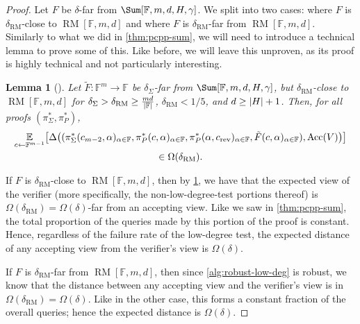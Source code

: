 \documentclass[english,12pt]{reedthesis}
\theoremstyle{plain}
\newtheorem{lemma}[lemma]{Lemma}
\theoremstyle{definition}
\theoremstyle{remark}
\DeclareMathOperator{\Acc}{Acc}
\DeclareMathOperator{\rev}{rev}
\DeclareMathOperator{\RM}{RM}
\DeclarePairedDelimiter{\abs}{\lvert}{\rvert}
\begin{document}
\begin{proof}
  Let $F$ be $\delta$-far from $\Sum[\mathbb{F}, m, d, H, \gamma]$. We split into two
  cases: where $F$ is $\delta_{\RM}$-close to $\RM[\mathbb{F}, m, d]$ and where $F$
  is $\delta_{\RM}$-far from $\RM[\mathbb{F}, m, d]$. Similarly to what we did in
  \cref{thm:pcpp-sum}, we will need to introduce a technical lemma to prove some
  of this. Like before, we will leave this unproven, as its proof is highly
  technical and not particularly interesting.

  \begin{lemma}[{\cite[Lemma 5.3]{GOS25}}]\label{lem:sum-ev-close}
    Let $\tilde{F}\colon \mathbb{F}^{m} \rightarrow \mathbb{F}$ be $\delta_{\Sigma}$-far from
    $\Sum[\mathbb{F}, m, d, H, \gamma]$, but $\delta_{\RM}$-close to $\RM[\mathbb{F}, m, d]$
    for $\delta_{\Sigma} > \delta_{\RM} \ge \frac{md}{\abs{\mathbb{F}}}$, $\delta_{\RM} < 1/5$, and
    $d \ge \abs{H} + 1$. Then, for all proofs $(\pi_{\Sigma}^{*}, \pi_{P}^{*})$,
    \begin{multline}
      \underset{c \leftarrow \mathbb{F}^{m-1}}{\mathbb{E}}\mleft[
      \Delta\mleft(
      (\pi_{\Sigma}^{*}(c_{m-2}, \alpha)_{\alpha \in \mathbb{F}}, \pi_{P}^{*}(c, \alpha)_{\alpha \in \mathbb{F}},
      \pi_{P}^{*}(\alpha, c_{\rev})_{\alpha \in \mathbb{F}}, \tilde{F}(c, \alpha)_{\alpha \in \mathbb{F}}),
      \Acc(V)
      \mright)
      \mright] \\
      \in \Omega(\delta_{\RM}).
    \end{multline}
  \end{lemma}

  If $F$ is $\delta_{\RM}$-close to $\RM[\mathbb{F}, m, d]$, then by
  \cref{lem:sum-ev-close}, we have that the expected view of the verifier (more
  specifically, the non-low-degree-test portions thereof) is
  $\Omega(\delta_{\RM}) = \Omega(\delta)$-far from an accepting view. Like we saw in
  \cref{thm:pcpp-sum}, the total proportion of the queries made by this portion
  of the proof is constant. Hence, regardless of the failure rate of the
  low-degree test, the expected distance of any accepting view from the
  verifier's view is $\Omega(\delta)$.

  If $F$ is $\delta_{\RM}$-far from $\RM[\mathbb{F}, m, d]$, then since
  \cref{alg:robust-low-deg} is robust, we know that the distance between any
  accepting view and the verifier's view is in $\Omega(\delta_{\RM}) = \Omega(\delta)$. Like in the
  other case, this forms a constant fraction of the overall queries; hence the
  expected distance is $\Omega(\delta)$.
\end{proof}
\end{document}
